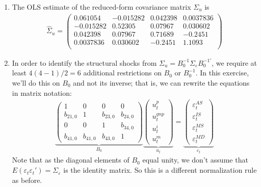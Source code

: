 \begin{enumerate}
\item The OLS estimate of the reduced-form covariance matrix \(\Sigma_u\) is
\begin{align*}
    \widehat{\Sigma}_u = \begin{pmatrix}
         0.061054  &  -0.015282  &   0.042398  &  0.0037836 \\
        -0.015282  &    0.52305  &    0.07967  &   0.030602 \\
         0.042398  &    0.07967  &    0.71689  &    -0.2451 \\
        0.0037836  &   0.030602  &    -0.2451  &     1.1093 \\
    \end{pmatrix} 
\end{align*}

\item In order to identify the structural shocks from \(\Sigma_u = B_0^{-1} \Sigma_\varepsilon B_0^{-1'}\),
  we require at least \(4(4-1)/2=6\) additional restrictions on \(B_0\) or \(B_0^{-1}\).
In this exercise, we'll do this on \(B_0\) and not its inverse; that is, we can rewrite the equations in matrix notation:
\begin{align*}
    \underbrace{\begin{pmatrix} 1 & 0 & 0 & 0 \\ b_{21,0} & 1 & b_{23,0} & b_{24,0} \\ 0 & 0 & 1 & b_{34,0} \\ b_{41,0} & b_{41,0} & b_{43,0} & 1\end{pmatrix}}_{B_0}
    \underbrace{\begin{pmatrix}u_t^p\\u_t^{gnp}\\u_t^{i}\\u_t^{m} \end{pmatrix}}_{u_t}
    =
    \underbrace{\begin{pmatrix}\varepsilon_t^{AS}\\\varepsilon_t^{IS}\\\varepsilon_t^{MS}\\\varepsilon_t^{MD} \end{pmatrix}}_{\varepsilon_t}
\end{align*}
Note that as the diagonal elements of \(B_0\) equal unity, we don't assume that \(E(\varepsilon_t \varepsilon_t')=\Sigma_\varepsilon \) is the identity matrix.
So this is a different normalization rule as before.


\end{enumerate}
